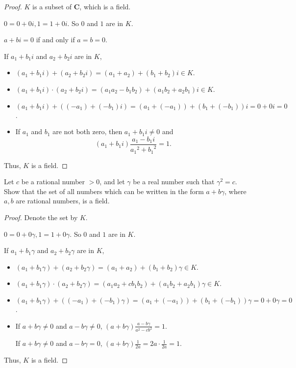 \begin{proof}
    $K$ is a subset of $\mathbf{C}$, which is a field.

    $0 = 0 + 0i, 1 = 1 + 0i$. So $0$ and $1$ are in $K$.

    $a + bi = 0$ if and only if $a = b = 0$.

    If $a_{1} + b_{1}i$ and $a_{2} + b_{2}i$ are in $K$,
    \begin{itemize}
        \item $(a_{1} + b_{1}i) + (a_{2} + b_{2}i) = (a_{1} + a_{2}) + (b_{1} + b_{2})i \in K$.
        \item $(a_{1} + b_{1}i)\cdot (a_{2} + b_{2}i) = (a_{1}a_{2} - b_{1}b_{2}) + (a_{1}b_{2} + a_{2}b_{1})i \in K$.
        \item $(a_{1} + b_{1}i) + ((-a_{1}) + (-b_{1})i) = (a_{1} + (-a_{1})) + (b_{1} + (-b_{1}))i = 0 + 0i = 0$.
        \item If $a_{1}$ and $b_{1}$ are not both zero, then $a_{1} + b_{1}i \ne 0$ and
              \[
                  (a_{1} + b_{1}i)\frac{a_{1} - b_{1}i}{{a_{1}}^{2} + {b_{1}}^{2}} = 1.
              \]
    \end{itemize}

    Thus, $K$ is a field.
\end{proof}

\begin{exercise}
    Let $c$ be a rational number $> 0$, and let $\gamma$ be a real number such that ${\gamma}^{2} = c$. Show that the set of all numbers which can be written in the form $a + b\gamma$, where $a, b$ are rational numbers, is a field.
\end{exercise}

\begin{proof}
    Denote the set by $K$.

    $0 = 0 + 0\gamma, 1 = 1 + 0\gamma$. So $0$ and $1$ are in $K$.

    If $a_{1} + b_{1}\gamma$ and $a_{2} + b_{2}\gamma$ are in $K$,
    \begin{itemize}
        \item $(a_{1} + b_{1}\gamma) + (a_{2} + b_{2}\gamma) = (a_{1} + a_{2}) + (b_{1} + b_{2})\gamma \in K$.
        \item $(a_{1} + b_{1}\gamma)\cdot (a_{2} + b_{2}\gamma) = (a_{1}a_{2} + cb_{1}b_{2}) + (a_{1}b_{2} + a_{2}b_{1})\gamma \in K$.
        \item $(a_{1} + b_{1}\gamma) + ((-a_{1}) + (-b_{1})\gamma) = (a_{1} + (-a_{1})) + (b_{1} + (-b_{1}))\gamma = 0 + 0\gamma = 0$.
        \item If $a + b\gamma \ne 0$ and $a - b\gamma\ne 0$, $(a + b\gamma)\frac{a - b\gamma}{{a}^{2} - c{b}^{2}} = 1$.

              If $a + b\gamma \ne 0$ and $a - b\gamma = 0$, $(a + b\gamma)\frac{1}{2a} = 2a\cdot\frac{1}{2a} = 1$.
    \end{itemize}

    Thus, $K$ is a field.
\end{proof}

